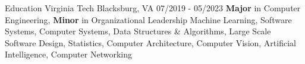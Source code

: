 \documentclass{resume}
\begin{document}
    \maketitle

    \begin{resSection}{Education}
        \vspace{1ex}
        {Virginia Tech}
        {Blacksburg, VA}
        {07/2019 - 05/2023}
        {\textbf{Major} in Computer Engineering, \textbf{Minor} in Organizational Leadership}
        {Machine Learning, Software Systems, Computer Systems, Data Structures \& Algorithms, Large Scale Software Design, Statistics, Computer Architecture, Computer Vision, Artificial Intelligence, Computer Networking}

    \end{resSection}

\end{document}
